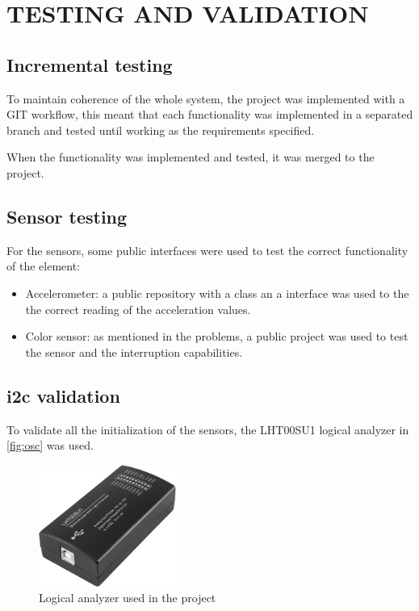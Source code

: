 \section{TESTING AND VALIDATION}
\subsection{Incremental testing}
To maintain coherence of the whole system, the project was implemented with a GIT workflow, this meant that each functionality was implemented in a separated branch and tested until working as the requirements specified.

When the functionality was implemented and tested, it was merged to the project.

\subsection{Sensor testing}

For the sensors, some public interfaces were used to test the correct functionality of the element:
\begin{itemize}
    \item Accelerometer: a public repository\cite{MMA8451driverMMA8451} with a class an a interface was used to the the correct reading of the acceleration values.
    \item Color sensor: as mentioned in the problems, a public project\cite{TCS3472_I2CClasswhich} was used to test the sensor and the interruption capabilities.
\end{itemize}

\subsection{\acrshort{i2c} validation}

To validate all the initialization of the sensors, the LHT00SU1 logical analyzer in \autoref{fig:osc} was used.
\begin{figure}[H]
    \centering
    \includegraphics[width=0.4\textwidth]{images/7/Osc.jpg}
    \caption{Logical analyzer used in the project}
    \label{fig:osc}
\end{figure}

